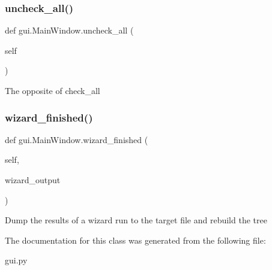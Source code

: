 \subsubsection{\texorpdfstring{uncheck\+\_\+all()}{uncheck\_all()}}
{\footnotesize\ttfamily def gui.\+Main\+Window.\+uncheck\+\_\+all (\begin{DoxyParamCaption}\item[{}]{self }\end{DoxyParamCaption})}

\begin{DoxyVerb}The opposite of check_all \end{DoxyVerb}
 \mbox{\label{classgui_1_1_main_window_a0512eaf390eb7541b1f21d734e5ac5b4}} 
\subsubsection{\texorpdfstring{wizard\+\_\+finished()}{wizard\_finished()}}
{\footnotesize\ttfamily def gui.\+Main\+Window.\+wizard\+\_\+finished (\begin{DoxyParamCaption}\item[{}]{self,  }\item[{}]{wizard\+\_\+output }\end{DoxyParamCaption})}

\begin{DoxyVerb}Dump the results of a wizard run to the target file and rebuild the tree \end{DoxyVerb}
 

The documentation for this class was generated from the following file\+:\begin{DoxyCompactItemize}
\item 
gui.\+py\end{DoxyCompactItemize}
